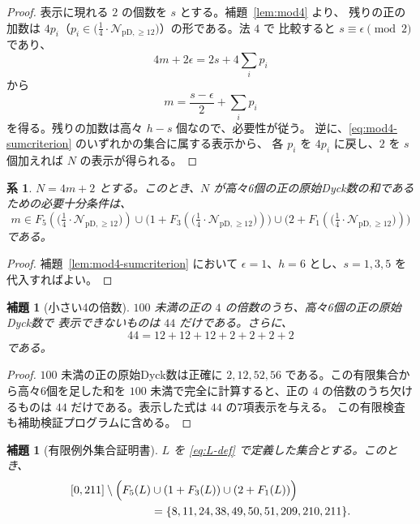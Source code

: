 \documentclass[12pt]{ltjsarticle}
\theoremstyle{plain}
\newtheorem{lemma}[theorem]{補題}
\newtheorem{corollary}[theorem]{系}
\theoremstyle{definition}
\theoremstyle{plain}
\newcommand{\Pset}{%
  \bigl(\tfrac{1}{4}\cdot\mathcal{N}_{\mathrm{pD},\geq 12}\bigr)%
}
\begin{document}
\begin{proof}
表示に現れる $2$ の個数を $s$ とする。補題~\ref{lem:mod4} より、
残りの正の加数は $4p_i$（$p_i\in\Pset$）の形である。法 $4$ で
比較すると $s\equiv\epsilon\pmod2$ であり、
\[
 4m+2\epsilon=2s+4\sum_i p_i
\]
から
\[
 m=\frac{s-\epsilon}{2}+\sum_i p_i
\]
を得る。残りの加数は高々 $h-s$ 個なので、必要性が従う。
逆に、\eqref{eq:mod4-sumcriterion} のいずれかの集合に属する表示から、
各 $p_i$ を $4p_i$ に戻し、$2$ を $s$ 個加えれば $N$ の表示が得られる。
\end{proof}

\begin{corollary}\label{cor:sixcriterion}
$N=4m+2$ とする。このとき、$N$ が高々6個の正の原始Dyck数の和である
ための必要十分条件は、
\begin{equation}\label{eq:sixcriterion}
 m\in F_5(\Pset)
 \cup\bigl(1+F_3(\Pset)\bigr)
 \cup\bigl(2+F_1(\Pset)\bigr)
\end{equation}
である。
\end{corollary}

\begin{proof}
補題~\ref{lem:mod4-sumcriterion} において
$\epsilon=1$、$h=6$ とし、$s=1,3,5$ を代入すればよい。
\end{proof}

\begin{lemma}[小さい4の倍数]\label{lem:smallmultiples}
$100$ 未満の正の $4$ の倍数のうち、高々6個の正の原始Dyck数で
表示できないものは $44$ だけである。さらに、
\[
 44=12+12+12+2+2+2+2
\]
である。
\end{lemma}

\begin{proof}
$100$ 未満の正の原始Dyck数は正確に
$2,12,52,56$ である。この有限集合から高々6個を足した和を
$100$ 未満で完全に計算すると、正の $4$ の倍数のうち欠けるものは
$44$ だけである。表示した式は $44$ の7項表示を与える。
この有限検査も補助検証プログラムに含める。
\end{proof}

\begin{lemma}[有限例外集合証明書]\label{lem:finiteexception}
$L$ を \eqref{eq:L-def} で定義した集合とする。このとき、
\begin{equation}\label{eq:finiteexception}
\begin{split}
 [0,211]\setminus\Bigl(
 F_5(L)&\cup(1+F_3(L))\cup(2+F_1(L))\Bigr)\\
 &=\{8,11,24,38,49,50,51,209,210,211\}.
\end{split}
\end{equation}
\end{lemma}
\end{document}
